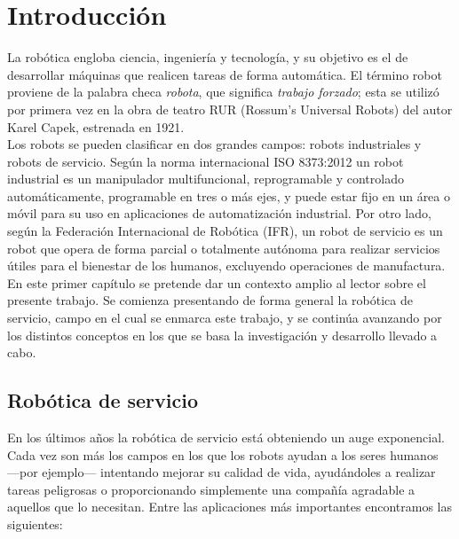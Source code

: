 \chapter{Introducción}
\label{cap:capitulo1}
\setcounter{page}{1}

\vspace{1cm}

La robótica engloba ciencia, ingeniería y tecnología, y su objetivo es el de desarrollar máquinas que realicen tareas de forma automática. El término robot proviene de la palabra checa \textit{robota}, que significa \textit{trabajo forzado}; esta se utilizó por primera vez en la obra de teatro RUR (Rossum's Universal Robots) del autor Karel Capek, estrenada en 1921.\\

Los robots se pueden clasificar en dos grandes campos: robots industriales y robots de servicio. Según la norma internacional ISO 8373:2012 un robot industrial es un manipulador multifuncional, reprogramable y controlado automáticamente, programable en tres o más ejes, y puede estar fijo en un área o móvil para su uso en aplicaciones de automatización industrial. Por otro lado, según la Federación Internacional de Robótica (IFR), un robot de servicio es un robot que opera de forma parcial o totalmente autónoma para realizar servicios útiles para el bienestar de los humanos, excluyendo operaciones de manufactura.\\

En este primer capítulo se pretende dar un contexto amplio al lector sobre el presente trabajo. Se comienza presentando de forma general la robótica de servicio, campo en el cual se enmarca este trabajo, y se continúa avanzando por los distintos conceptos en los que se basa la investigación y desarrollo llevado a cabo.

\section{Robótica de servicio}
\label{sec:robotica} %

En los últimos años la robótica de servicio está obteniendo un auge exponencial. Cada vez son más los campos en los que los robots ayudan a los seres humanos ---por ejemplo--- intentando mejorar su calidad de vida, ayudándoles a realizar tareas peligrosas o proporcionando simplemente una compañía agradable a aquellos que lo necesitan. Entre las aplicaciones más importantes encontramos las siguientes:

